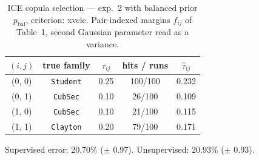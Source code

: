 \begin{table}[htbp]
  \centering
  \caption{ICE copula selection — exp.\ 2 with balanced prior $p_{\text{bal}}$, criterion: xvcic. Pair-indexed margins $f_{ij}$ of Table~1, second Gaussian parameter read as a variance.}
  \label{tab:exp3-exp2_bal_p__xvcic}
  \begin{tabular}{ccccc}
    \toprule
    $(i, j)$ & true family & $\tau_{ij}$ & hits / runs & $\hat\tau_{ij}$ \\
    \midrule
    (0, 0) & \texttt{Student} & 0.25 & 100/100 & 0.232 \\
    (0, 1) & \texttt{CubSec} & 0.10 & 26/100 & 0.109 \\
    (1, 0) & \texttt{CubSec} & 0.10 & 21/100 & 0.115 \\
    (1, 1) & \texttt{Clayton} & 0.20 & 79/100 & 0.171 \\
    \bottomrule
  \end{tabular}
  \par\smallskip Supervised error: 20.70\% ($\pm$ 0.97). Unsupervised: 20.93\% ($\pm$ 0.93).
\end{table}
